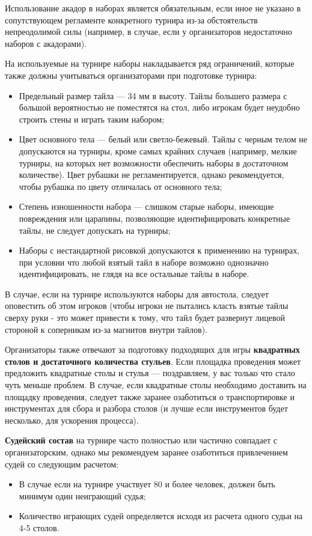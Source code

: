 Использование акадор в наборах является обязательным, если иное не указано в сопутствующем регламенте конкретного турнира из-за обстоятельств непреодолимой силы (например, в случае, если у организаторов недостаточно наборов с акадорами).

На используемые на турнире наборы накладывается ряд ограничений, которые также должны учитываться организаторами при подготовке турнира:

\begin{itemize}
	\item Предельный размер тайла --- 34 мм в высоту. Тайлы большего размера с большой вероятностью не поместятся на стол, либо игрокам будет неудобно строить стены и играть таким набором;
	\item Цвет основного тела --- белый или светло-бежевый. Тайлы с черным телом не допускаются на турниры, кроме самых крайних случаев (например, мелкие турниры, на которых нет возможности обеспечить наборы в достаточном количестве). Цвет рубашки не регламентируется, однако рекомендуется, чтобы рубашка по цвету отличалась от основного тела;
	\item Степень изношенности набора --- слишком старые наборы, имеющие повреждения или царапины, позволяющие идентифицировать конкретные тайлы, не следует допускать на турниры;
	\item Наборы с нестандартной рисовкой допускаются к применению на турнирах, при условии что любой взятый тайл в наборе возможно однозначно идентифицировать, не глядя на все остальные тайлы в наборе.
\end{itemize}

В случае, если на турнире используются наборы для автостола, следует оповестить об этом игроков (чтобы игроки не пытались класть взятые тайлы сверху руки - это может привести к тому, что тайл будет развернут лицевой стороной к соперникам из-за магнитов внутри тайлов).

Организаторы также отвечают за подготовку подходящих для игры \textbf{квадратных столов и достаточного количества стульев}. Если площадка проведения может предложить квадратные столы и стулья --- поздравляем, у вас только что стало чуть меньше проблем. В случае, если квадратные столы необходимо доставить на площадку проведения, следует также заранее озаботиться о транспортировке и инструментах для сбора и разбора столов (и лучше если инструментов будет несколько, для ускорения процесса).

\textbf{Судейский состав} на турнире часто полностью или частично совпадает с организаторским, однако мы рекомендуем заранее озаботиться привлечением судей со следующим расчетом:
\begin{itemize}
	\item В случае если на турнире участвует 80 и более человек, должен быть минимум один неиграющий судья;
	\item Количество играющих судей определяется исходя из расчета одного судьи на 4-5 столов.
\end{itemize}

